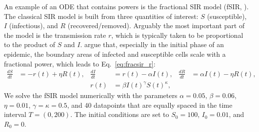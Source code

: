\documentclass[9pt]{article}
\begin{document}
An example of an ODE that contains powers is the fractional SIR model (fSIR,
\cite{taghvaei_fractional_2020}).  The classical SIR model is built from three
quantities of interest: $S$ (susceptible), $I$ (infectious), and $R$
(recovered/removed).  Arguably the most important part of the model is the
transmission rate $r$, which is typically taken to be proportional to the
product of $S$ and $I$.  \citet{taghvaei_fractional_2020} argue that,
especially in the initial phase of an epidemic, the boundary areas of infected
and susceptible cells scale with a fractional power, which leads to
Eq.~\ref{eq:fracsir_r}:
\begin{align}
  \label{eq:fracsir}
  \frac{dS}{dt} &= -r(t) + \eta R(t), &
  \frac{dI}{dt} &=  r(t) - \alpha I(t), &
  \frac{dR}{dt} &= \alpha I(t) - \eta R(t),\\
  \label{eq:fracsir_r}
  & & r(t) &= \beta I(t)^\gamma S(t)^\kappa,
\end{align}
We solve the fSIR model numerically with the parameters $\alpha=0.05$,
$\beta=0.06$, $\eta=0.01$, $\gamma=\kappa=0.5$, and 40 datapoints that are
equally spaced in the time interval $T=(0,200)$. The initial conditions are set
to $S_0=100$, $I_0=0.01$, and $R_0=0$.
\end{document}
